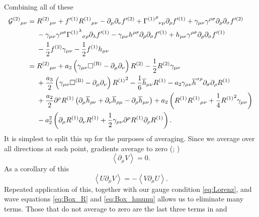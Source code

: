 Combining all of these
\begin{align}
{\mathcal{G}^{(2)}}_{\mu\nu} = {} & {R^{(2)}}_{\mu\nu} + f'^{(1)}{R^{(1)}}_{\mu\nu} - \partial_\mu\partial_\nu f'^{(2)} + {{\Gamma^{(1)}}^\rho}_{\nu\mu}\partial_\rho f'^{(1)} + \gamma_{\mu\nu}\gamma^{\rho\sigma}\partial_\rho\partial_\sigma f'^{(2)} \nonumber \\*
  & - {} \gamma_{\mu\nu}\gamma^{\rho\sigma}{{\Gamma^{(1)}}^\lambda}_{\sigma\rho}\partial_\lambda f'^{(1)} - \gamma_{\mu\nu}h^{\rho\sigma}\partial_\rho\partial_\sigma f'^{(1)} + h_{\mu\nu}\gamma^{\rho\sigma}\partial_\rho\partial_\sigma f'^{(1)} \nonumber \\*
  & - {} \frac{1}{2}f^{(2)}\gamma_{\mu\nu} - \frac{1}{2}f^{(1)}h_{\mu\nu} \nonumber \\*
 = {} & {R^{(2)}}_{\mu\nu} + a_2\left(\gamma_{\mu\nu}\Box^{(\text{B})} - \partial_\mu\partial_\nu\right)R^{(2)} - \frac{1}{2}R^{(2)}\gamma_{\mu\nu} \nonumber \\*
  & + {} \frac{a_3}{2}\left(\gamma_{\mu\nu}\Box^{(\text{B})} - \partial_\mu\partial_\nu\right){R^{(1)}}^2 - \frac{1}{6}\overline{h}_{\mu\nu}R^{(1)} - a_2\gamma_{\mu\nu}\overline{h}^{\sigma\rho}\partial_\sigma\partial_\rho R^{(1)} \nonumber \\*
  & + {} \frac{a_2}{2} \partial^\rho R^{(1)} \left(\partial_\mu\overline{h}_{\rho\nu} + \partial_\nu\overline{h}_{\rho\mu} - \partial_\rho\overline{h}_{\mu\nu}\right) + a_2\left(R^{(1)}{R^{(1)}}_{\mu\nu} + \frac{1}{4}{R^{(1)}}^2\gamma_{\mu\nu}\right) \nonumber \\* 
  & - {} a_2^2\left(\partial_\mu R^{(1)}\partial_\nu R^{(1)} + \frac{1}{2} \gamma_{\mu\nu}\partial^\rho R^{(1)}\partial_\rho R^{(1)}\right).
 \label{eq:G2}
\end{align}
It is simplest to split this up for the purposes of averaging. Since we average over all directions at each point, gradients average to zero (\citealt[section 17.11]{Hobson2006}; \citealt{Stein2011})
\begin{equation}
\left\langle\partial_\mu V\right\rangle = 0.
\end{equation}
As a corollary of this
\begin{equation}
\left\langle U\partial_\mu V\right\rangle = -\left\langle V \partial_\mu U\right\rangle.
\end{equation}
Repeated application of this, together with our gauge condition \eqref{eq:Lorenz}, and wave equations \eqref{eq:Box_R} and \eqref{eq:Box_hmunu} allows us to eliminate many terms. Those that do not average to zero are the last three terms in  and

